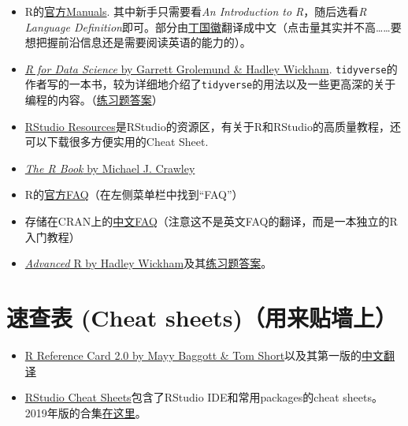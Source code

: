 \documentclass[]{book}
\providecommand{\tightlist}{%
  \setlength{\itemsep}{0pt}\setlength{\parskip}{0pt}}
\begin{document}
\begin{itemize}
\tightlist
\item
  R的\href{https://cran.r-project.org/manuals.html}{官方Manuals}.
  其中新手只需要看\emph{An Introduction to R}，随后选看\emph{R Language Definition}即可。部分由\href{https://github.com/dingguohui}{丁国徽}翻译成中文（点击量其实并不高\ldots{}\ldots{}要想把握前沿信息还是需要阅读英语的能力的）。
\item
  \href{https://r4ds.had.co.nz}{\emph{R for Data Science} by Garrett Grolemund \& Hadley Wickham}. \texttt{tidyverse}的作者写的一本书，较为详细地介绍了\texttt{tidyverse}的用法以及一些更高深的关于编程的内容。（\href{https://jrnold.github.io/r4ds-exercise-solutions/}{练习题答案}）
\item
  \href{https://resources.rstudio.com}{RStudio Resources}是RStudio的资源区，有关于R和RStudio的高质量教程，还可以下载很多方便实用的Cheat Sheet.
\item
  \href{https://github.com/TianyiShi2001/R-Tutorial-Resorces/blob/master/资源/书籍/TheRBook.pdf}{\emph{The R Book} by Michael J. Crawley}
\item
  R的\href{https://cran.r-project.org}{官方FAQ}（在左侧菜单栏中找到``FAQ''）
\item
  存储在CRAN上的\href{https://cran.r-project.org/doc/contrib/Liu-FAQ.pdf}{中文FAQ}（注意这不是英文FAQ的翻译，而是一本独立的R入门教程）
\item
  \href{https://adv-r.hadley.nz/index.html}{\emph{Advanced} R by Hadley Wickham}及其\href{https://advanced-r-solutions.rbind.io}{练习题答案}。
\end{itemize}

\hypertarget{-cheat-sheets}{%
\section{速查表 (Cheat sheets)（用来贴墙上）}\label{-cheat-sheets}}

\begin{itemize}
\tightlist
\item
  \href{https://cran.r-project.org/doc/contrib/Baggott-refcard-v2.pdf}{R Reference Card 2.0 by Mayy Baggott \& Tom Short}以及其第一版的\href{https://cran.r-project.org/doc/contrib/Liu-R-refcard.pdf}{中文翻译}
\item
  \href{https://www.rstudio.com/resources/cheatsheets/}{RStudio Cheat Sheets}包含了RStudio IDE和常用packages的cheat sheets。2019年版的合集\href{https://www.rstudio.com/wp-content/uploads/2019/01/Cheatsheets_2019.pdf}{在这里}。
\end{itemize}
\end{document}
